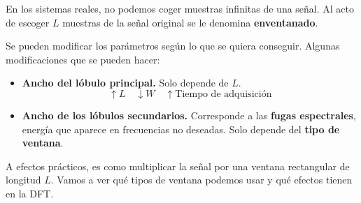 \documentclass[a4paper,oneside]{book}
\begin{document}
En los sistemas reales, no podemos coger muestras infinitas de una señal. Al acto de escoger $L$ muestras de la señal original se le denomina \textbf{enventanado}. 

Se pueden modificar los parámetros según lo que se quiera conseguir. Algunas modificaciones que se pueden hacer:
\begin{itemize}
	\item \textbf{Ancho del lóbulo principal.} Solo depende de $L$. \[ \uparrow L \quad \downarrow W \quad \uparrow \textrm{Tiempo de adquisición} \]
	\item \textbf{Ancho de los lóbulos secundarios.} Corresponde a las \textbf{fugas espectrales}, energía que aparece en frecuencias no deseadas. Solo depende del \textbf{tipo de ventana}.
\end{itemize}

A efectos prácticos, es como multiplicar la señal por una ventana rectangular de longitud $L$. Vamos a ver qué tipos de ventana podemos usar y qué efectos tienen en la DFT.

\newpage
\end{document}
